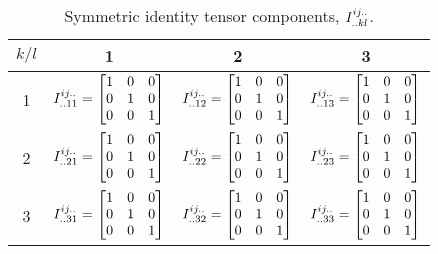 \begin{table}[htb] \centering
  \begin{tabular}{|c|c|c|c|} \hline
    $k/l$ & 1 & 2 & 3 \\ \hline \hline
    1 & $ I ^{ij..}_{..11}=\begin{bmatrix} 1 & 0 & 0 \\ 0 & 1 & 0 \\ 0 & 0 & 1 \end{bmatrix}$
    & $ I ^{ij..}_{..12}=\begin{bmatrix} 1 & 0 & 0 \\ 0 & 1 & 0 \\ 0 & 0 & 1 \end{bmatrix}$
    & $ I ^{ij..}_{..13}=\begin{bmatrix} 1 & 0 & 0 \\ 0 & 1 & 0 \\ 0 & 0 & 1 \end{bmatrix}$ \\ \hline
    2 & $ I ^{ij..}_{..21}=\begin{bmatrix} 1 & 0 & 0 \\ 0 & 1 & 0 \\ 0 & 0 & 1 \end{bmatrix}$
    & $ I ^{ij..}_{..22}=\begin{bmatrix} 1 & 0 & 0 \\ 0 & 1 & 0 \\ 0 & 0 & 1 \end{bmatrix}$
    & $ I ^{ij..}_{..23}=\begin{bmatrix} 1 & 0 & 0 \\ 0 & 1 & 0 \\ 0 & 0 & 1 \end{bmatrix}$ \\ \hline
    3 & $ I ^{ij..}_{..31}=\begin{bmatrix} 1 & 0 & 0 \\ 0 & 1 & 0 \\ 0 & 0 & 1 \end{bmatrix}$
    & $ I ^{ij..}_{..32}=\begin{bmatrix} 1 & 0 & 0 \\ 0 & 1 & 0 \\ 0 & 0 & 1 \end{bmatrix}$
    & $ I ^{ij..}_{..33}=\begin{bmatrix} 1 & 0 & 0 \\ 0 & 1 & 0 \\ 0 & 0 & 1 \end{bmatrix}$ \\ \hline
  \end{tabular}
  \caption{Symmetric identity tensor components, $ I ^{ij..}_{..kl}$.}
  \label{tab:TensorComponentsFourthOrderSymmetricIdentity}
\end{table}
